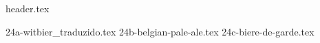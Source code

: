 \clearpage
{}
\divisorLine

{header.tex}

\begin{multicols}{2}

{24a-witbier_traduzido.tex}
{24b-belgian-pale-ale.tex}
{24c-biere-de-garde.tex}

\end{multicols}
